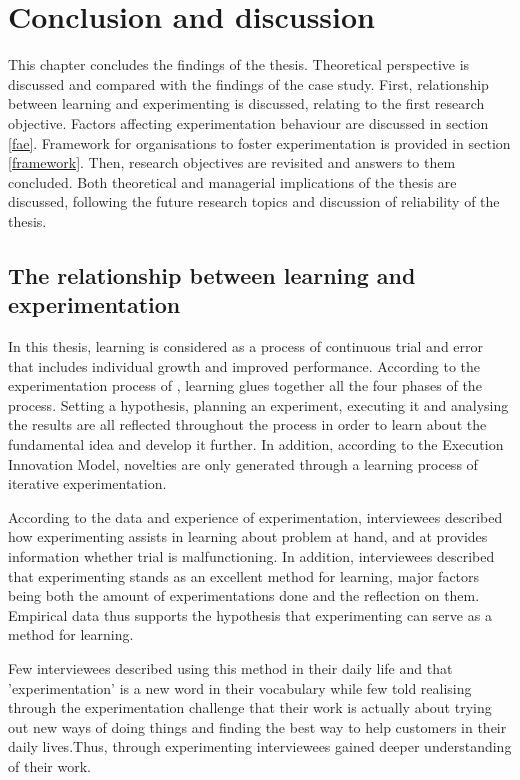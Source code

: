 \chapter{Conclusion and discussion}
This chapter concludes the findings of the thesis. Theoretical perspective is discussed and compared with the findings of the case study. First, relationship between learning and experimenting is discussed, relating to the first research objective. Factors affecting experimentation behaviour are discussed in section \ref{fae}. Framework for organisations to foster experimentation is provided in section \ref{framework}. Then, research objectives are revisited and answers to them concluded. Both theoretical and managerial implications of the thesis are discussed, following the future research topics and discussion of reliability of the thesis. 

\section{The relationship between learning and experimentation} \label{relation}
In this thesis, learning is considered as a process of continuous trial and error \citep{argyris1978organizational,edmondson1999psychological} that includes individual growth and improved performance. According to the experimentation process of \citet{thomke1998managing}, learning glues together all the four phases of the process. Setting a hypothesis, planning an experiment, executing it and analysing the results are all reflected throughout the process in order to learn about the fundamental idea and develop it further. In addition, according to the Execution Innovation Model, novelties are only generated through a learning process of iterative experimentation. \citep{tuulenmaki2011art} 

According to the data and experience of experimentation, interviewees described how experimenting assists in learning about problem at hand, and at provides information whether trial is malfunctioning. In addition, interviewees described that experimenting stands as an excellent method for learning, major factors being both the amount of experimentations done and the reflection on them. Empirical data thus supports the hypothesis that experimenting can serve as a method for learning. 

Few interviewees described using this method in their daily life and that 'experimentation' is a new word in their vocabulary while few told realising through the experimentation challenge that their work is actually about trying out new ways of doing things and finding the best way to help customers in their daily lives.Thus, through experimenting interviewees gained deeper understanding of their work.

